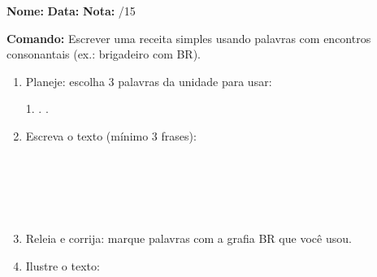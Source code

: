 

\begin{exercicio}

\noindent\textbf{Nome:} \underline{\hspace{3.2cm}} \quad \textbf{Data:} \underline{\hspace{1.6cm}} \quad \textbf{Nota:} \underline{\hspace{0.9cm}}/15


\noindent\textbf{Comando:} Escrever uma receita simples usando palavras com encontros consonantais (ex.: brigadeiro com BR).


\begin{enumerate}

  \item Planeje: escolha 3 palavras da unidade para usar:
  \begin{center}
  1. \underline{\hspace{3cm}} . \underline{\hspace{3cm}} . \underline{\hspace{3cm}}
  \end{center}

  \item Escreva o texto (mínimo 3 frases):
  \begin{center}
  \underline{\hspace{12cm}}\\\underline{\hspace{12cm}}\\\underline{\hspace{12cm}}\\\underline{\hspace{12cm}}\\\underline{\hspace{12cm}}
  \end{center}

  \item Releia e corrija: marque palavras com a grafia BR que você usou.

  \item Ilustre o texto:
  \begin{center}
  \end{center}

\end{enumerate}

\end{exercicio}

